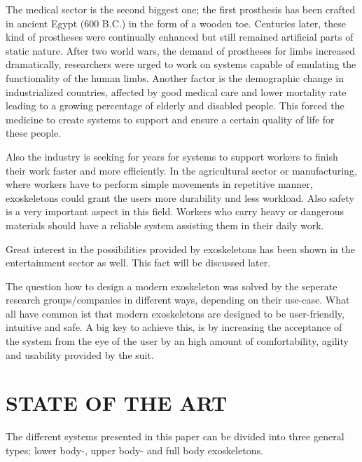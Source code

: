 \documentclass[letterpaper, 10 pt, conference]{ieeeconf}  %
\begin{document}

The medical sector is the second biggest one; the first prosthesis has been crafted in ancient Egypt (600 B.C.)
in the form of a wooden toe. Centuries later, these kind of prostheses were continually enhanced but still remained
artificial parts of static nature. After two world wars, the demand of prostheses for limbs increased dramatically,
researchers were urged to work on systems capable of emulating the functionality of the human limbs. Another factor
is the demographic change in industrialized countries, affected by good medical care and lower mortality rate leading
to a growing percentage of elderly and disabled people. This forced the medicine to create systems to support and
ensure a certain quality of life for these people.


Also the industry is seeking for years for systems to support workers to finish their work faster and more efficiently.
In the agricultural sector or manufacturing, where workers have to perform simple movements in repetitive manner,
exoskeletons could grant the users more durability und less workload. Also safety is a very important aspect in this field.
Workers who carry heavy or dangerous materials should have a reliable system assisting them in their daily
work.

Great interest in the possibilities provided by exoskeletons has been shown in the entertainment sector as well.
This fact will be discussed later.


The question how to design a modern exoskeleton was solved by the seperate research groups/companies in different ways, depending on their use-case. What all have common ist that modern exoskeletons are designed to be user-friendly, intuitive and safe. A big key to achieve this, is by increasing the acceptance of the system from the eye of the user by  an high amount of comfortability, agility and usability provided by the suit. 



\section{STATE OF THE ART}

The different systems presented in this paper can be divided into three general types; lower body-, upper body- and full body exoskeletons.
\end{document}
